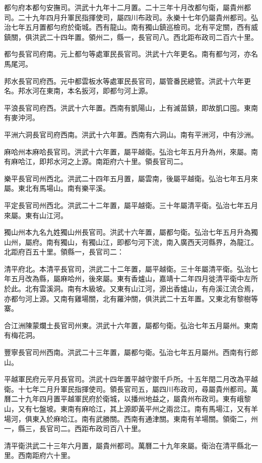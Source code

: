 都勻府本都勻安撫司。洪武十九年十二月置。二十三年十月改都勻衛，屬貴州都司。二十九年四月升軍民指揮使司，屬四川布政司。永樂十七年仍屬貴州都司。弘治七年五月置都勻府於衛城。西有龍山。南有獨山鎮巡檢司。北有平定關，西有威鎮關，俱洪武二十四年置。領州二，縣一，長官司八。西北距布政司二百六十里。

都勻長官司府南。元上都勻等處軍民長官司。洪武十六年更名。南有都勻河，亦名馬尾河。

邦水長官司府西。元中都雲板水等處軍民長官司，屬管番民總管。洪武十六年更名。邦水河在東南，本名扳河，即都勻河上源。

平浪長官司府西。洪武十六年置。西南有凱陽山，上有滅苗鎮，即故凱口囤。東南有麥沖河。

平洲六洞長官司府西南。洪武十六年置。西南有六洞山。南有平洲河，中有沙洲。

麻哈州本麻哈長官司。洪武十六年置，屬平越衛。弘治七年五月升為州，來屬。南有麻哈江，即邦水河之上源。南距府六十里。領長官司二。

樂平長官司州西北。洪武二十四年五月置，屬雲南，後屬平越衛。弘治七年五月來屬。東北有馬場山。南有樂平溪。

平定長官司州西北。洪武二十二年置，屬平越衛。三十年屬清平衛。弘治七年五月來屬。東有山江河。

獨山州本九名九姓獨山州長官司。洪武十六年置，屬都勻衛。弘治七年五月升為獨山州，屬府。南有獨山，有獨山江，即都勻河下流，南入廣西天河縣界，為龍江。北距府百五十里。領縣一，長官司二：

清平府北。本清平長官司，洪武二十二年置，屬平越衛。三十年屬清平衛。弘治七年五月改為縣，屬麻哈州，後來屬。東有香爐山，嘉靖十二年四月徙清平衛中左所於此。北有雲溪洞。南有木級坡。又東有山江河，源出香爐山，有舟溪江流合焉，亦都勻河上源。又南有雞場關，北有羅沖關，俱洪武二十五年置。又東北有黎樹等寨。

合江洲陳蒙爛土長官司州東。洪武十六年置，屬都勻衛。弘治七年五月屬州。東南有梅花洞。

豐寧長官司州西南。洪武二十三年置，屬都勻衛。弘治七年五月屬州。西南有行郎山。

平越軍民府元平月長官司。洪武十四年置平越守禦千戶所。十五年閏二月改為平越衛。十七年二月升軍民指揮使司。領長官司五，屬四川布政司，尋屬貴州都司。萬曆二十九年四月置平越軍民府於衛城，以播州地益之，屬貴州布政司。東有峨黎山，又有七盤坡。東南有麻哈江，其上源即黃平州之兩岔江。南有馬場江，又有羊場河，俱東入於麻哈江。南有武勝關。西南有通津關。東南有羊場關。領衛二，州一，縣三，長官司二。西距布政司百八十里。

清平衛洪武二十三年六月置，屬貴州都司。萬曆二十九年來屬。衛治在清平縣北一里。西南距府六十里。

